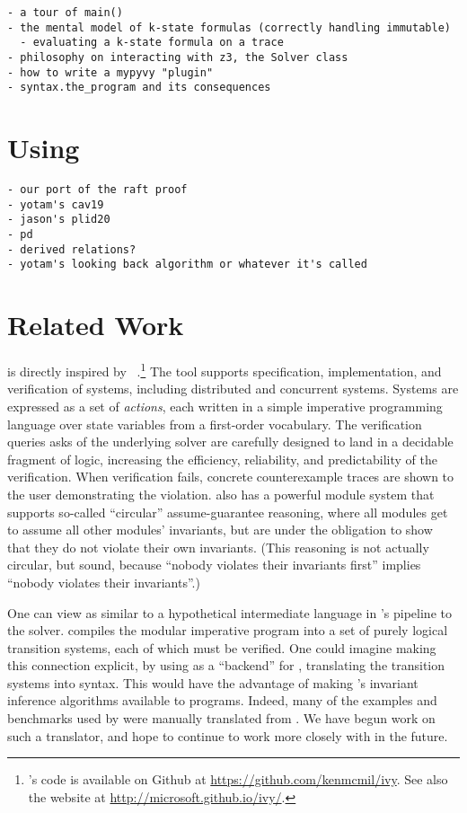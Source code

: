 \begin{verbatim}
- a tour of main()
- the mental model of k-state formulas (correctly handling immutable)
  - evaluating a k-state formula on a trace
- philosophy on interacting with z3, the Solver class
- how to write a mypyvy "plugin"
- syntax.the_program and its consequences
\end{verbatim}

\section{Using \mypyvy}

\begin{verbatim}
- our port of the raft proof
- yotam's cav19
- jason's plid20
- pd
- derived relations?
- yotam's looking back algorithm or whatever it's called
\end{verbatim}

\section{Related Work}

\mypyvy is directly inspired by \ivy~\cite{Padon-al:PLDI16}.\footnote{
  \ivy's code is available on Github at \url{https://github.com/kenmcmil/ivy}.
  See also the \ivy website at \url{http://microsoft.github.io/ivy/}.
}
%
The \ivy tool supports specification, implementation, and verification of systems,
including distributed and concurrent systems.
%
Systems are expressed as a set of \emph{actions},
each written in a simple imperative programming language
over state variables from a first-order vocabulary.
%
The verification queries \ivy asks of the underlying solver
are carefully designed to land in a decidable fragment of logic,
increasing the efficiency, reliability, and predictability
of the verification.
%
When verification fails, concrete counterexample traces
are shown to the user demonstrating the violation.
%
\ivy{} also has a powerful module system
that supports so-called ``circular'' assume-guarantee reasoning,
where all modules get to assume all other modules' invariants,
but are under the obligation to show that they do not violate
their own invariants.
%
(This reasoning is not actually circular, but sound,
because ``nobody violates their invariants first''
implies ``nobody violates their invariants''.)

One can view \mypyvy as similar to a hypothetical intermediate language
in \ivy{}'s pipeline to the solver.
%
\ivy{} compiles the modular imperative program
into a set of purely logical transition systems,
each of which must be verified.
%
One could imagine making this connection explicit,
by using \mypyvy as a ``backend'' for \ivy,
translating the transition systems into \mypyvy syntax.
%
This would have the advantage of making
\mypyvy's invariant inference algorithms available
to \ivy programs.
%
Indeed, many of the examples and benchmarks used by \mypyvy
were manually translated from \ivy.
%
We have begun work on such a translator,
and hope to continue to work more closely with \ivy in the future.


